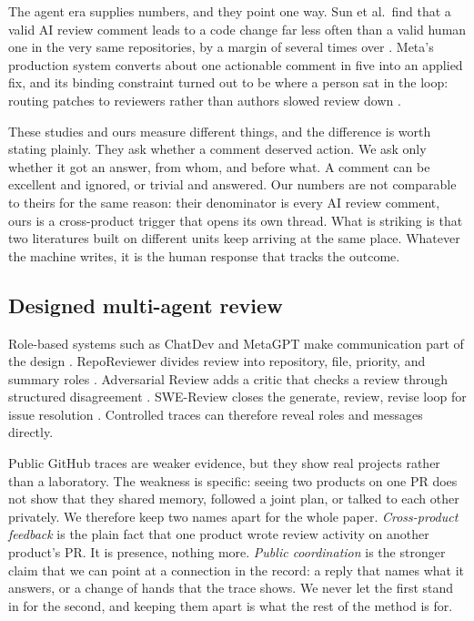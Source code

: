 \documentclass[lineno,pdflatex,sn-basic]{sn-jnl}
\begin{document}
The agent era supplies numbers, and they point one way. Sun et al.\ find that a
valid AI review comment leads to a code change far less often than a valid human
one in the very same repositories, by a margin of several times over
\citep{sun2026aicodereview}. Meta's production system converts about one
actionable comment in five into an applied fix, and its binding constraint turned
out to be where a person sat in the loop: routing patches to reviewers rather
than authors slowed review down \citep{maddila2026aifixes}.

These studies and ours measure different things, and the difference is worth
stating plainly. They ask whether a comment deserved action. We ask only whether
it got an answer, from whom, and before what. A comment can be excellent and
ignored, or trivial and answered. Our numbers are not comparable to theirs for
the same reason: their denominator is every AI review comment, ours is a
cross-product trigger that opens its own thread. What is striking is that two
literatures built on different units keep arriving at the same place. Whatever
the machine writes, it is the human response that tracks the outcome.

\subsection{Designed multi-agent review}

Role-based systems such as ChatDev and MetaGPT make communication part of the
design \citep{qian2023chatdev,hong2023metagpt}. RepoReviewer divides review into
repository, file, priority, and summary roles \citep{zhang2026reporeviewer}.
Adversarial Review adds a critic that checks a review through structured
disagreement \citep{qiu2026adversarial}. SWE-Review closes the generate, review, revise loop for issue resolution
\citep{wang2026swereview}. Controlled traces can
therefore reveal roles and messages directly.

Public GitHub traces are weaker evidence, but they show real projects rather than
a laboratory. The weakness is specific: seeing two products on one PR does not
show that they shared memory, followed a joint plan, or talked to each other
privately. We therefore keep two names apart for the whole paper.
\emph{Cross-product feedback} is the plain fact that one product wrote review
activity on another product's PR. It is presence, nothing more. \emph{Public
coordination} is the stronger claim that we can point at a connection in the
record: a reply that names what it answers, or a change of hands that the trace
shows. We never let the first stand in for the second, and keeping them apart is
what the rest of the method is for.
\end{document}
